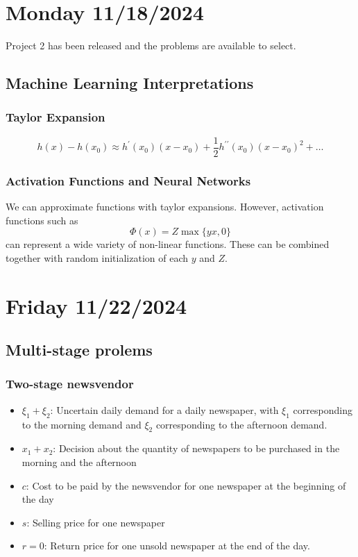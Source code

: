 \section{Monday 11/18/2024}
Project 2 has been released and the problems are available to select.
\subsection{Machine Learning Interpretations}
\subsubsection{Taylor Expansion}
\begin{equation}
  h(x) - h(x_0) \approx h^\prime(x_0)(x-x_0) + \frac{1}{2} h^{\prime \prime}(x_0)(x-x_0)^2 + \dots
\end{equation}
\subsubsection{Activation Functions and Neural Networks}
We can approximate functions with taylor expansions. However, activation functions such as
\begin{equation}
  \Phi(x) = Z \max \{ yx,0  \} 
\end{equation}
can represent a wide variety of non-linear functions. These can be combined together with random initialization of each $y$ and $Z$.

\section{Friday 11/22/2024}
\subsection{Multi-stage prolems}
\subsubsection{Two-stage newsvendor}
\begin{itemize}
  \item $\xi_1 + \xi_2$: Uncertain daily demand for a daily newspaper, with $\xi_1$ corresponding to the morning demand and $\xi_2$ corresponding to the afternoon demand.
  \item $x_1 + x_2$: Decision about the quantity of newspapers to be purchased in the morning and the afternoon
  \item $c$: Cost to be paid by the newsvendor for one newspaper at the beginning of the day
  \item $s$: Selling price for one newspaper
  \item $r=0$: Return price for one unsold newspaper at the end of the day.
\end{itemize}

